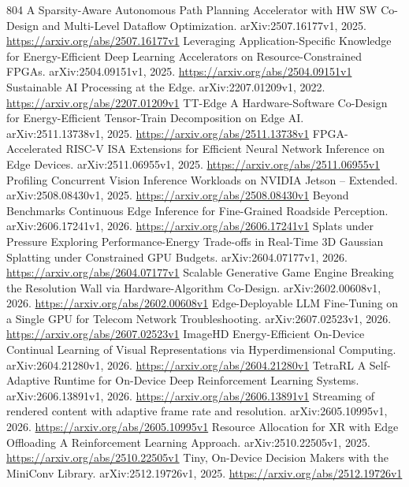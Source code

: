 \documentclass[11pt]{article}
\begin{document}
\begin{thebibliography}{804}
 A Sparsity-Aware Autonomous Path Planning Accelerator with HW SW Co-Design and Multi-Level Dataflow Optimization. arXiv:2507.16177v1, 2025. \url{https://arxiv.org/abs/2507.16177v1}
 Leveraging Application-Specific Knowledge for Energy-Efficient Deep Learning Accelerators on Resource-Constrained FPGAs. arXiv:2504.09151v1, 2025. \url{https://arxiv.org/abs/2504.09151v1}
 Sustainable AI Processing at the Edge. arXiv:2207.01209v1, 2022. \url{https://arxiv.org/abs/2207.01209v1}
 TT-Edge A Hardware-Software Co-Design for Energy-Efficient Tensor-Train Decomposition on Edge AI. arXiv:2511.13738v1, 2025. \url{https://arxiv.org/abs/2511.13738v1}
 FPGA-Accelerated RISC-V ISA Extensions for Efficient Neural Network Inference on Edge Devices. arXiv:2511.06955v1, 2025. \url{https://arxiv.org/abs/2511.06955v1}
 Profiling Concurrent Vision Inference Workloads on NVIDIA Jetson -- Extended. arXiv:2508.08430v1, 2025. \url{https://arxiv.org/abs/2508.08430v1}
 Beyond Benchmarks Continuous Edge Inference for Fine-Grained Roadside Perception. arXiv:2606.17241v1, 2026. \url{https://arxiv.org/abs/2606.17241v1}
 Splats under Pressure Exploring Performance-Energy Trade-offs in Real-Time 3D Gaussian Splatting under Constrained GPU Budgets. arXiv:2604.07177v1, 2026. \url{https://arxiv.org/abs/2604.07177v1}
 Scalable Generative Game Engine Breaking the Resolution Wall via Hardware-Algorithm Co-Design. arXiv:2602.00608v1, 2026. \url{https://arxiv.org/abs/2602.00608v1}
 Edge-Deployable LLM Fine-Tuning on a Single GPU for Telecom Network Troubleshooting. arXiv:2607.02523v1, 2026. \url{https://arxiv.org/abs/2607.02523v1}
 ImageHD Energy-Efficient On-Device Continual Learning of Visual Representations via Hyperdimensional Computing. arXiv:2604.21280v1, 2026. \url{https://arxiv.org/abs/2604.21280v1}
 TetraRL A Self-Adaptive Runtime for On-Device Deep Reinforcement Learning Systems. arXiv:2606.13891v1, 2026. \url{https://arxiv.org/abs/2606.13891v1}
 Streaming of rendered content with adaptive frame rate and resolution. arXiv:2605.10995v1, 2026. \url{https://arxiv.org/abs/2605.10995v1}
 Resource Allocation for XR with Edge Offloading A Reinforcement Learning Approach. arXiv:2510.22505v1, 2025. \url{https://arxiv.org/abs/2510.22505v1}
 Tiny, On-Device Decision Makers with the MiniConv Library. arXiv:2512.19726v1, 2025. \url{https://arxiv.org/abs/2512.19726v1}

\end{thebibliography}
\end{document}
